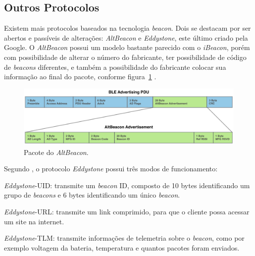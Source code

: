\documentclass[
		12pt,				%
		openright,			%
		oneside,			%
		a4paper,			%
		chapter=TITLE,		%
		english,			%
		brazil				%
	]{abntex2}
\begin{document}
\subsection{Outros Protocolos}

Existem mais protocolos baseados na tecnologia \textit{beacon}. Dois se destacam por ser abertos e passíveis de alterações: \textit{AltBeacon} e \textit{Eddystone}, este último criado pela Google. O \textit{AltBeacon} possui um modelo bastante parecido com o \textit{iBeacon}, porém com possibilidade de alterar o número do fabricante, ter possibilidade de código de \textit{beacons} diferentes, e também a possibilidade do fabricante colocar sua informação ao final do pacote, conforme figura~\ref{fig:altbeacon-packet} \cite{arm-beacons}.

\begin{figure}[htb]
	\caption{\label{fig:altbeacon-packet}Pacote do \textit{AltBeacon}.}
	\begin{center}
		\includegraphics[width=1\textwidth]{img/altbeacon-packet.png}
	\end{center}
\end{figure}

Segundo , o protocolo \textit{Eddystone} possui três modos de funcionamento:
\begin{alineas}
	\item \textit{Eddystone}-UID: transmite um \textit{beacon} ID, composto de 10 bytes identificando um grupo de \textit{beacons} e  6 bytes identificando um único \textit{beacon}.
	\item \textit{Eddystone}-URL: transmite um link comprimido, para que o cliente possa acessar um site na internet.
	\item \textit{Eddystone}-TLM: transmite informações de telemetria sobre o \textit{beacon}, como por exemplo voltagem da bateria, temperatura e quantos pacotes foram enviados.
\end{alineas}



\end{document}
